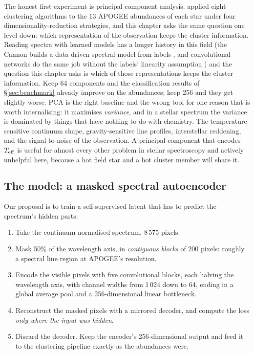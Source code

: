 The honest first experiment is principal component analysis.
\citet{GarciaDias:19} applied eight clustering algorithms to the 13 APOGEE
abundances of each star under four dimensionality-reduction strategies, and
this chapter asks the same question one level down: which representation of the
observation keeps the cluster information. Reading spectra with learned models
has a longer history in this field (the Cannon builds a data-driven spectral
model from labels \citep{Ness:15}, and convolutional networks do the same job
without the labels' linearity assumption \citep{Ting:19}) and the question this
chapter asks is which of those representations keeps the cluster information.
Keep 64 components and the classification results of \S\ref{sec:benchmark}
already improve on the abundances; keep 256 and they get slightly worse. PCA is
the right baseline and the wrong tool for one reason that is worth
internalising: it maximises \emph{variance}, and in a stellar spectrum the
variance is dominated by things that have nothing to do with chemistry. The
temperature-sensitive continuum shape, gravity-sensitive line profiles,
interstellar reddening, and the signal-to-noise of the observation. A principal
component that encodes $T_{\rm eff}$ is useful for almost every other problem
in stellar spectroscopy and actively unhelpful here, because a hot field star
and a hot cluster member will share it.

\subsection{The model: a masked spectral autoencoder}

Our proposal \citep{He:22} is to train a self-supervised latent that has to
predict the spectrum's hidden parts:

\begin{enumerate}
\item Take the continuum-normalised spectrum, 8\,575 pixels.
\item Mask 50\% of the wavelength axis, in \emph{contiguous blocks} of 200
pixels: roughly a spectral line region at APOGEE's resolution.
\item Encode the visible pixels with five convolutional blocks, each halving
  the wavelength axis, with channel widths from 1\,024 down to 64, ending in a
  global average pool and a 256-dimensional linear bottleneck.
\item Reconstruct the masked pixels with a mirrored decoder, and compute the
loss \emph{only where the input was hidden}.
\item Discard the decoder. Keep the encoder's 256-dimensional output and feed
  it to the clustering pipeline exactly as the abundances were.
\end{enumerate}

